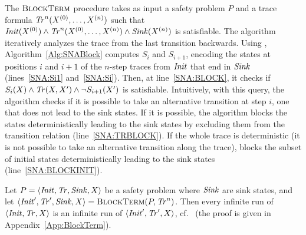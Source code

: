 The $\textsc{BlockTerm}$ procedure takes as input a safety problem $P$ and a trace formula $\mathit{Tr}^{n}(X^{(0)}, \ldots, X^{(n)})$ such 
that $\mathit{Init}(X^{(0)}) \land \mathit{Tr}^{n}(X^{(0)}, \ldots, X^{(n)}) \land \mathit{Sink}(X^{(n)})$ is satisfiable.
The algorithm iteratively analyzes the trace from the last transition backwards.
Using \QE, Algorithm~\ref{Alg:SNABlock} computes $S_i$ and $S_{i+1}$,
encoding the states at positions $i$ and $i+1$ of the $n$-step traces from $\mathit{Init}$ that end in $\mathit{Sink}$ (lines~\ref{SNA:Si1} and~\ref{SNA:Si}).
Then, at line~\ref{SNA:BLOCK}, it checks if $S_i(X) \land \mathit{Tr}(X,X') \land \lnot S_{i+1}(X')$ is satisfiable. %
Intuitively, with this query, the algorithm checks if it is possible to take an alternative transition at step $i$, one that does not lead to the sink states.
If it is possible, the algorithm blocks the states deterministically leading to the sink states by excluding them from the transition relation (line~\ref{SNA:TRBLOCK}).
If the whole trace is deterministic (it is not possible to take an alternative transition along the trace), \blockTerm blocks the subset of initial states deterministically leading to the sink states (line~\ref{SNA:BLOCKINIT}).

\begin{lemma}\label{Lem:DETTERM}
    Let $P = \langle \mathit{Init}, \mathit{Tr}, \mathit{Sink}, X \rangle$ be a safety problem where $\mathit{Sink}$ are sink states,
    and let $\langle \mathit{Init}', \mathit{Tr}', \mathit{Sink}, X \rangle = \textsc{BlockTerm}(P, \mathit{Tr}^n)$.
    Then every infinite run of $\langle \mathit{Init}, \mathit{Tr}, X \rangle$ is an infinite run of $\langle \mathit{Init}', \mathit{Tr}', X \rangle$, cf.~\cite{DBLP:conf/tacas/ChenCFNO14} (the proof is given in Appendix~\ref{App:BlockTerm}).
\end{lemma}

